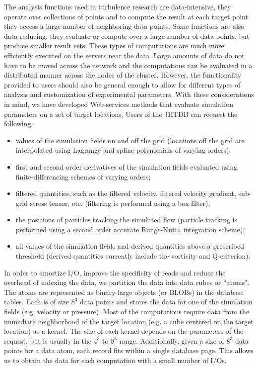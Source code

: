 \documentclass[10pt,twocolumn]{article}
\begin{document}
The analysis functions used in turbulence research are data-intensive, they operate over collections of points and to compute the result at each target point
they access a large number of neighboring data points. Some functions are also data-reducing, they evaluate or compute over a large number of data
points, but produce smaller result sets. These types of computations are much more efficiently executed on the servers near the data. Large amounts of data
do not have to be moved across the network and the computations can be evaluated in a distributed manner across the nodes of the cluster. However, the
functionality provided to users should also be general enough to allow for different types of analysis and customization of experimental parameters.
With these considerations in mind, we have developed Web-services methods that evaluate simulation parameters on a set of target locations. Users of 
the JHTDB can request the following:
\begin{itemize}
\item values of the simulation fields on and off the grid (locations off the grid are interpolated using Lagrange and spline polynomials of varying orders);
\item first and second order derivatives of the simulation fields evaluated using finite-differencing schemes of varying orders;
\item filtered quantities, such as the filtered velocity, filtered velocity gradient, sub-grid stress tensor, etc. (filtering is performed using a box filter);
\item the positions of particles tracking the simulated flow (particle tracking is performed using a second order accurate Runge-Kutta integration scheme);
\item all values of the simulation fields and derived quantities above a prescribed threshold (derived quantities currently include the vorticity and Q-criterion).
\end{itemize}

In order to amortize I/O, improve the specificity of reads and reduce the overhead of indexing the data, we partition the data into data cubes or ``atoms".
The atoms are represented as binary-large objects (or BLOBs) in the database tables. Each is of size $8^3$ data points and stores the data for one of the
simulation fields (e.g. velocity or pressure). Most of the computations require data from the immediate neighborhood of the target location (e.g. a cube
centered on the target location) as a kernel. The size of each kernel depends on the parameters of the request, but is usually in the $4^3$ to $8^3$ range.
Additionally, given a size of $8^3$ data points for a data atom, each record fits within a single database page. This allows us to obtain the data for each
computation with a small number of I/Os.
\end{document}
